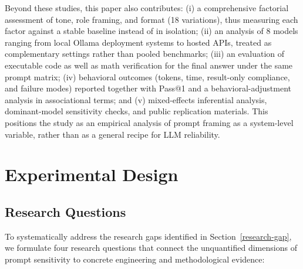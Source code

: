 \documentclass[a4paper,fleqn]{cas-sc}
\begin{document}
Beyond these studies, this paper also contributes: (i) a comprehensive factorial assessment of tone, role framing, and format (18 variations), thus measuring each factor against a stable baseline instead of in isolation; (ii) an analysis of 8 models ranging from local Ollama deployment systems to hosted APIs, treated as complementary settings rather than pooled benchmarks; (iii) an evaluation of executable code as well as math verification for the final answer under the same prompt matrix; (iv) behavioral outcomes (tokens, time, result-only compliance, and failure modes) reported together with Pass@1 and a behavioral-adjustment analysis in associational terms; and (v) mixed-effects inferential analysis, dominant-model sensitivity checks, and public replication materials. This positions the study as an empirical analysis of prompt framing as a system-level variable, rather than as a general recipe for LLM reliability.

\section{Experimental Design}\label{experimental-design}

\subsection{Research Questions}\label{research-questions}

To systematically address the research gaps identified in Section~\ref{research-gap}, we formulate four research questions that connect the unquantified dimensions of prompt sensitivity to concrete engineering and methodological evidence:
\end{document}
